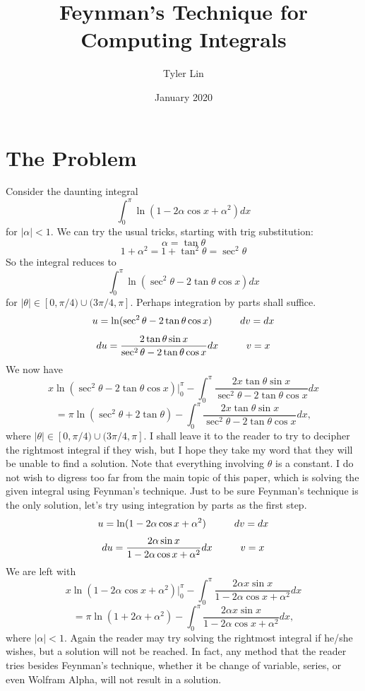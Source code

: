 \documentclass{article}
\title{Feynman's Technique for Computing Integrals}
\author{Tyler Lin}
\date{January 2020}
\begin{document}
\maketitle

\section*{The Problem}
Consider the daunting integral $$\int_{0}^{\pi} \ln(1-2\alpha\cos{x}+\alpha^2)dx$$ for $|\alpha|<1$. We can try the usual tricks, starting with trig substitution:
$$\alpha=\tan{\theta}$$
$$1+\alpha^2=1+\tan^2{\theta}=\sec^2{\theta}$$
So the integral reduces to $$\int_{0}^{\pi} \ln(\sec^2{\theta}-2\tan{\theta}\cos{x})dx$$ for $|\theta| \in [0,\pi/4) \cup (3\pi/4, \pi]$.
Perhaps integration by parts shall suffice.
$$u=\ln(\sec^2{\theta}-2\tan{\theta}\cos{x}) \hspace{10mm} dv=dx$$
$$du=\frac{2\tan{\theta}\sin{x}}{\sec^2{\theta}-2\tan{\theta}\cos{x}}dx \hspace{10mm} v=x$$
We now have
$$x\ln(\sec^2{\theta}-2\tan{\theta}\cos{x})\bigg\vert_{0}^{\pi} - \int_{0}^{\pi} \frac{2x\tan{\theta}\sin{x}}{\sec^2{\theta}-2\tan{\theta}\cos{x}}dx$$
$$= \pi\ln(\sec^2{\theta}+2\tan{\theta}) - \int_{0}^{\pi} \frac{2x\tan{\theta}\sin{x}}{\sec^2{\theta}-2\tan{\theta}\cos{x}}dx,$$
where $|\theta| \in [0,\pi/4) \cup (3\pi/4, \pi]$.
\newline I shall leave it to the reader to try to decipher the rightmost integral if they wish, but I hope they take my word that they will be unable to find a solution. Note that everything involving $\theta$ is a constant.
\newline I do not wish to digress too far from the main topic of this paper, which is solving the given integral using Feynman's technique. Just to be sure Feynman's technique is the only solution, let's try using integration by parts as the first step. 
$$u=\ln(1-2\alpha\cos{x}+\alpha^2) \hspace{10mm} dv=dx$$
$$du=\frac{2\alpha\sin{x}}{1-2\alpha\cos{x}+\alpha^2}dx \hspace{10mm} v=x$$
We are left with
$$x\ln(1-2\alpha\cos{x}+\alpha^2)\bigg\vert_{0}^{\pi} - \int_{0}^{\pi}\frac{2\alpha{x}\sin{x}}{1-2\alpha\cos{x}+\alpha^2}dx$$
$$= \pi\ln(1+2\alpha+\alpha^2) - \int_{0}^{\pi}\frac{2\alpha{x}\sin{x}}{1-2\alpha\cos{x}+\alpha^2}dx,$$
where $|\alpha|<1$. 
\newline Again the reader may try solving the rightmost integral if he/she wishes, but a solution will not be reached. In fact, any method that the reader tries besides Feynman's technique, whether it be change of variable, series, or even Wolfram Alpha, will not result in a solution.
\end{document}
